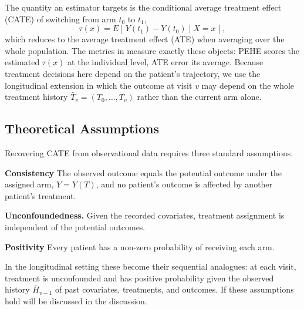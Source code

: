 \documentclass{article}
\begin{document}
The quantity an estimator targets is the conditional average treatment effect (CATE)
of switching from arm $t_0$ to $t_1$,
\begin{equation}
    \tau(x) = {E}\!\left[\,Y(t_1) - Y(t_0) \mid X = x\,\right],
\end{equation}
which reduces to the average treatment effect (ATE) when averaging over the whole population. The
metrics in  measure exactly these objects: PEHE scores the
estimated $\tau(x)$ at the individual level, ATE error its average. Because treatment
decisions here depend on the patient's trajectory, we use the longitudinal extension
in which the outcome at visit $v$ may depend on the whole treatment history
$\bar{T}_v = (T_0,\dots,T_v)$ rather than the current arm alone.

\subsection{Theoretical Assumptions}
\label{sec:assumptions}
Recovering CATE from observational data requires three standard
assumptions.

\textbf{Consistency} The observed outcome equals the potential outcome under
the assigned arm, $Y = Y(T)$, and no patient's outcome is affected by another
patient's treatment.

\textbf{Unconfoundedness.} Given the recorded covariates, treatment assignment is
independent of the potential outcomes.

\textbf{Positivity} Every patient has a non-zero probability of receiving
each arm.

In the longitudinal setting these become their sequential analogues: at each visit,
treatment is unconfounded and has positive probability given the observed history
$\bar{H}_{v-1}$ of past covariates, treatments, and outcomes. If these assumptions hold will be discussed in the discussion.
\end{document}

